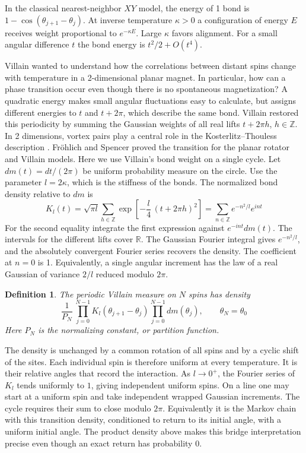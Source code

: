 \documentclass[11pt,a4paper]{article}
\newtheorem{defn}[thm]{Definition}
\theoremstyle{remark}
\begin{document}
In the classical nearest-neighbor $XY$ model, the energy of 1 bond is
$1-\cos(\theta_{j+1}-\theta_j)$. At inverse temperature $\kappa>0$ a
configuration of energy $E$ receives weight proportional to $e^{-\kappa E}$.
Large $\kappa$ favors alignment. For a small angular difference $t$ the bond
energy is $t^2/2+O(t^4)$.

Villain \cite{villain} wanted to understand how the correlations between
distant spins change with temperature in a 2-dimensional planar magnet.
In particular, how can a phase transition occur even though there is no
spontaneous magnetization? A quadratic energy makes small angular
fluctuations easy to calculate, but assigns different energies to $t$ and
$t+2\pi$, which describe the same bond. Villain restored this periodicity by
summing the Gaussian weights of all real lifts $t+2\pi h$, $h\in\mathbb Z$.
In 2 dimensions, vortex pairs play a central role in the
Kosterlitz--Thouless description \cite{kth}. Fr\"ohlich and Spencer
\cite{fsp} proved the transition for the planar rotator and Villain models.
Here we use Villain's bond weight on a single cycle.
Let $dm(t)=dt/(2\pi)$ be uniform probability measure on the circle. Use
the parameter $l=2\kappa$, which is the stiffness of the bonds. The normalized bond density relative to $dm$
is
\[
 K_l(t)=\sqrt{\pi l}\sum_{h\in\mathbb Z}
           \exp\!\left[-\frac{l}{4}\,(t+2\pi h)^2\right]
       =\sum_{n\in\mathbb Z}e^{-n^2/l}e^{int}
\]
For the second equality integrate the first expression against $e^{-int}dm(t)$.
The intervals for the different lifts cover $\mathbb R$. The Gaussian Fourier
integral gives $e^{-n^2/l}$, and the absolutely convergent Fourier series
recovers the density. The coefficient at $n=0$ is 1. Equivalently, a
single angular increment has the law of a real Gaussian of variance
$2/l$ reduced modulo $2\pi$.

\begin{samepage}
\begin{defn}
The periodic Villain measure on $N$ spins has density
\[
 \frac1{P_N}\,\prod_{j=0}^{N-1}K_l(\theta_{j+1}-\theta_j)
       \prod_{j=0}^{N-1}dm(\theta_j),\qquad \theta_N=\theta_0
\]
Here $P_N$ is the normalizing constant, or partition function.
\end{defn}
\end{samepage}

The density is unchanged by a common rotation of all spins and by a cyclic
shift of the sites. Each individual spin is therefore uniform at every
temperature. It is their relative angles that record the interaction.
As $l\to0^+$, the Fourier series of $K_l$ tends uniformly to $1$, giving
independent uniform spins. On a line one may start at a uniform spin and
take independent wrapped Gaussian increments. The cycle requires their
sum to close modulo $2\pi$. Equivalently it is the Markov chain with this
transition density, conditioned to return to its initial angle, with a
uniform initial angle. The product density above makes this bridge
interpretation precise even though an exact return has probability 0.
\end{document}
